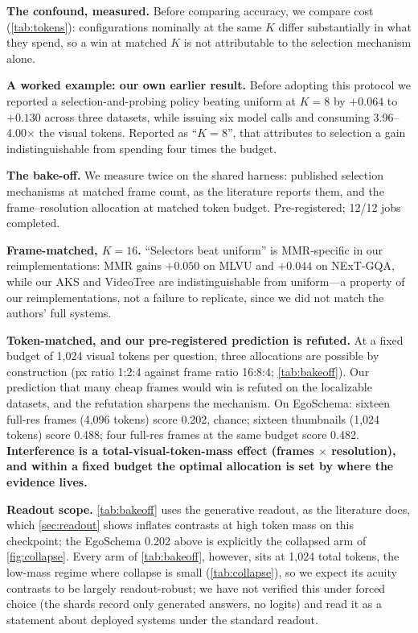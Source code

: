 \documentclass[10pt,twocolumn,letterpaper]{article}
\begin{document}
\noindent\textbf{The confound, measured.} Before comparing accuracy, we compare cost (\cref{tab:tokens}): configurations nominally at the same $K$ differ substantially in what they spend, so a win at matched $K$ is not attributable to the selection mechanism alone.

\noindent\textbf{A worked example: our own earlier result.} Before adopting this protocol we reported a selection-and-probing policy beating uniform at $K{=}8$ by $+0.064$ to $+0.130$ across three datasets, while issuing six model calls and consuming 3.96--4.00$\times$ the visual tokens. Reported as ``$K{=}8$'', that attributes to selection a gain indistinguishable from spending four times the budget.

\noindent\textbf{The bake-off.} We measure twice on the shared harness: published selection mechanisms at matched frame count, as the literature reports them, and the frame--resolution allocation at matched token budget. Pre-registered; 12/12 jobs completed.

\noindent\textbf{Frame-matched, $K{=}16$.} ``Selectors beat uniform'' is MMR-specific in our reimplementations: MMR gains $+0.050$ on MLVU and $+0.044$ on NExT-GQA, while our AKS and VideoTree are indistinguishable from uniform---a property of our reimplementations, not a failure to replicate, since we did not match the authors' full systems.

\noindent\textbf{Token-matched, and our pre-registered prediction is refuted.} At a fixed budget of 1,024 visual tokens per question, three allocations are possible by construction (px ratio 1:2:4 against frame ratio 16:8:4; \cref{tab:bakeoff}). Our prediction that many cheap frames would win is refuted on the localizable datasets, and the refutation sharpens the mechanism. On EgoSchema: sixteen full-res frames (4,096 tokens) score 0.202, chance; sixteen thumbnails (1,024 tokens) score 0.488; four full-res frames at the same budget score 0.482. \textbf{Interference is a total-visual-token-mass effect (frames $\times$ resolution), and within a fixed budget the optimal allocation is set by where the evidence lives.}

\noindent\textbf{Readout scope.} \cref{tab:bakeoff} uses the generative readout, as the literature does, which \cref{sec:readout} shows inflates contrasts at high token mass on this checkpoint; the EgoSchema 0.202 above is explicitly the collapsed arm of \cref{fig:collapse}. Every arm of \cref{tab:bakeoff}, however, sits at 1,024 total tokens, the low-mass regime where collapse is small (\cref{tab:collapse}), so we expect its acuity contrasts to be largely readout-robust; we have not verified this under forced choice (the shards record only generated answers, no logits) and read it as a statement about deployed systems under the standard readout.
\end{document}
